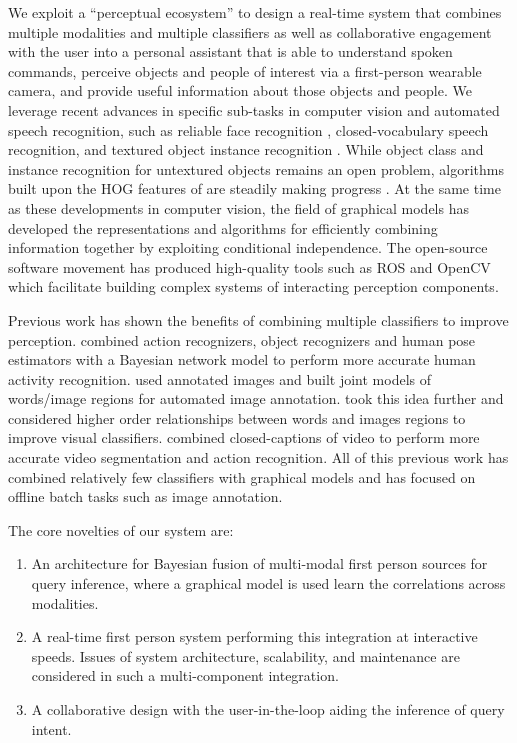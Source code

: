 \documentclass{llncs}
\begin{document}
We exploit a ``perceptual ecosystem'' to design a real-time system that combines multiple modalities and multiple classifiers as well as collaborative engagement with the user
into a personal assistant that is able to understand spoken commands, perceive objects and people of interest via a first-person wearable camera, and provide useful information about those objects and people. We leverage recent advances in specific sub-tasks in computer vision and automated speech recognition, such as reliable face recognition \citep{lbph,fisherfaces}, closed-vocabulary speech recognition, and textured object instance recognition \citep{moped}. While object class and instance recognition for untextured objects remains an open problem, algorithms built upon the HOG features of \citet{DT05} are steadily making progress \citep[e.g., ][]{lsvm-pami,exemplarsvm}. At the same time as these developments in computer vision, the field of graphical models has developed the representations and algorithms for efficiently combining information together by exploiting conditional independence. The open-source software movement has produced high-quality tools such as ROS \citep{ros} and OpenCV \citep{opencv} which facilitate building complex systems of interacting perception components.

Previous work has shown the benefits of combining multiple classifiers to improve perception. \citet{Gupta2007} combined action recognizers, object recognizers and human pose estimators with a Bayesian network model to perform more accurate human activity recognition. \citet{Barnard2003} used annotated images and built joint models of words/image regions for automated image annotation. \citet{Gupta2008} took this idea further and considered higher order relationships between words and images regions to improve visual
classifiers. \citet{Cour2008} combined closed-captions of video to perform more accurate video segmentation and action recognition. All of this previous work has combined relatively few classifiers with graphical models and has focused on offline batch tasks such as image annotation. 

The core novelties of our system are:\vspace{-0.04in}
\begin{enumerate}
\item An architecture for Bayesian fusion of multi-modal first person sources for query inference, where a graphical model is used learn the correlations across modalities. 
\item A real-time first person system performing this integration at interactive speeds. Issues of system architecture, scalability, and maintenance are considered in such a multi-component integration.
\item A collaborative design with the user-in-the-loop aiding the inference of query intent. 
\end{enumerate}
\end{document}
